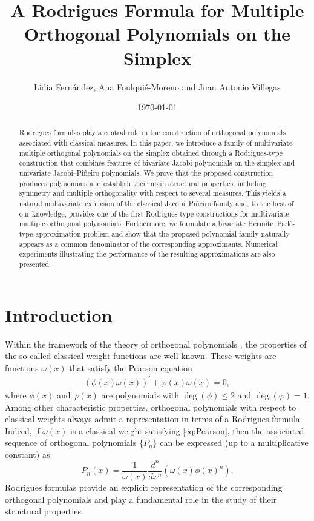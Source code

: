 \documentclass[11pt,reqno]{amsart}
\title{A Rodrigues Formula for Multiple Orthogonal Polynomials on the Simplex}
\author{Lidia Fern\'andez, Ana Foulqui\'e-Moreno and Juan Antonio Villegas}
\date{\today}
\theoremstyle{definition}
\begin{document}
\maketitle

\begin{abstract}

Rodrigues formulas play a central role in the construction of orthogonal polynomials associated with classical measures. In this paper, we introduce a family of multivariate multiple orthogonal polynomials on the simplex obtained through a Rodrigues-type construction that combines features of bivariate Jacobi polynomials on the simplex and univariate Jacobi--Piñeiro polynomials. We prove that the proposed construction produces polynomials and establish their main structural properties, including symmetry and multiple orthogonality with respect to several measures. This yields a natural multivariate extension of the classical Jacobi--Piñeiro family and, to the best of our knowledge, provides one of the first Rodrigues-type constructions for multivariate multiple orthogonal polynomials. Furthermore, we formulate a bivariate Hermite--Padé-type approximation problem and show that the proposed polynomial family naturally appears as a common denominator of the corresponding approximants. Numerical experiments illustrating the performance of the resulting approximations are also presented.

\end{abstract}



\section{Introduction}\label{sec:intro}

Within the framework of the theory of orthogonal polynomials \citep[Chapter 1]{Chi78}, the properties of the so-called classical weight functions are well known. These weights are functions $\omega(x)$ that satisfy the Pearson equation
\begin{align}
\label{eq:Pearson}
(\phi(x)\omega(x))^{\prime} + \varphi(x)\omega(x) = 0,
\end{align}
where $\phi(x)$ and $\varphi(x)$ are polynomials with $\deg(\phi)\le 2$ and $\deg(\varphi)=1$. Among other characteristic properties, orthogonal polynomials with respect to classical weights always admit a representation in terms of a Rodrigues formula. Indeed, if $\omega(x)$ is a classical weight satisfying \eqref{eq:Pearson}, then the associated sequence of  orthogonal polynomials $\{P_n\}$ can be expressed (up to a multiplicative constant) as
\begin{equation}
    \label{eq:Rodrigues-Jacobi}
    P_n(x)=\dfrac{1}{\omega(x)}\dfrac{d^n}{dx^n}(\omega(x)\phi(x)^n).
\end{equation}
Rodrigues formulas provide an explicit representation of the corresponding orthogonal polynomials and play a fundamental role in the study of their structural properties.
\end{document}
